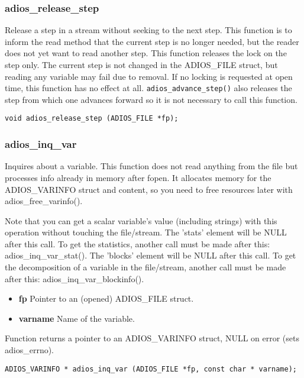 \subsubsection*{adios\_release\_step}
Release a step in a stream without seeking to the next step.
This function is to inform the read method that the current step is
no longer needed, but the reader does not yet want to read another step.
This function releases the lock on the step only. The current step is not
changed in the ADIOS\_FILE struct, but reading any variable may fail due to
removal. If no locking is requested at open time, this function has no
effect at all.
\verb+adios_advance_step()+ also releases the step from which one advances 
forward so it is not necessary to call this function.

\begin{lstlisting}[language=ADIOS]
void adios_release_step (ADIOS_FILE *fp);
\end{lstlisting}

\subsubsection*{adios\_inq\_var}
Inquires about a variable.
This function does not read anything from the file but processes info
already in memory after fopen.
It allocates memory for the ADIOS\_VARINFO struct and content, so
you need to free resources later with adios\_free\_varinfo().

Note that you can get a scalar variable's value (including strings)
with this operation without touching the file/stream.
The 'stats' element will be NULL after this call. To get the statistics, 
another call must be made after this: adios\_inq\_var\_stat().
The 'blocks' element will be NULL after this call. To get the decomposition
of a variable in the file/stream, another call must be made after this: 
adios\_inq\_var\_blockinfo().

\begin{itemize}
 \item{\bf fp} Pointer to an (opened) ADIOS\_FILE struct.
\item{\bf varname}  Name of the variable.
\end{itemize}
Function returns a pointer to an ADIOS\_VARINFO struct, NULL on error (sets adios\_errno).

\begin{lstlisting}[language=ADIOS]
ADIOS_VARINFO * adios_inq_var (ADIOS_FILE *fp, const char * varname);

\end{lstlisting}

